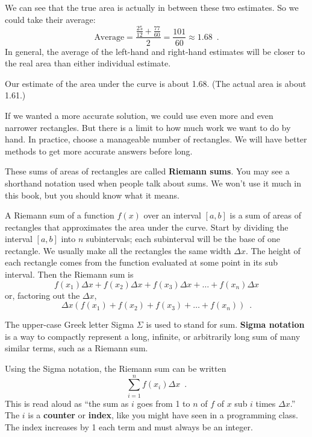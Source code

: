 \begin{example}
\begin{solution}
We can see that the true area is actually in between these two estimates. So we could take their average:
$$\text{Average} = \dfrac{\frac{25}{12} + \frac{77}{60}}{2} = \frac{101}{60}\approx   1.68 \enspace .$$
In general, the average of the left-hand and right-hand estimates will be closer to the real area than either individual estimate.

Our estimate of the area under the curve is about 1.68. (The actual area is about 1.61.)

\end{solution}\end{example}


If we wanted a more accurate solution, we could use even more and even narrower rectangles. But there is a limit to how much work we want to do by hand. In practice, choose a manageable number of rectangles. We will have better methods to get more accurate answers before long.

These sums of areas of rectangles are called {\bf Riemann sums}. You may see a shorthand notation used when people talk about sums. We won't use it much in this book, but you should know what it means.

\begin{definition}
A Riemann sum of a function $f(x)$ over an interval $[a,b]$ is a sum of areas of rectangles that approximates the area under the curve. Start by dividing the interval $[a,b]$ into $n$ subintervals; each subinterval will be the base of one rectangle. We usually make all the rectangles the same width $\Delta x$. The height of each rectangle comes from the function evaluated at some point in its sub interval. Then the Riemann sum is
$$f(x_1)\Delta x + f(x_2)\Delta x+f(x_3)\Delta x + \ldots +f(x_n)\Delta x$$
or, factoring out the $\Delta x$,
$$\Delta x(f(x_1)+f(x_2)+f(x_3)+\ldots +f(x_n)) \enspace .$$
\end{definition}
\begin{definition}
The upper-case Greek letter Sigma $\Sigma$ is used to stand for sum. {\bf Sigma notation} is a way to compactly represent a long, infinite, or arbitrarily long sum of many similar terms, such as a Riemann sum.

Using the Sigma notation, the Riemann sum can be written
$$\sum_{i=1}^n f(x_i)\Delta x \enspace .$$
This is read aloud as ``the sum as $i$ goes from 1 to $n$ of $f$ of $x$ sub $i$ times $\Delta x$.'' The $i$ is a {\bf counter} or {\bf index}, like you might have seen in a programming class. The index increases by 1 each term and must always be an integer.
\end{definition}

